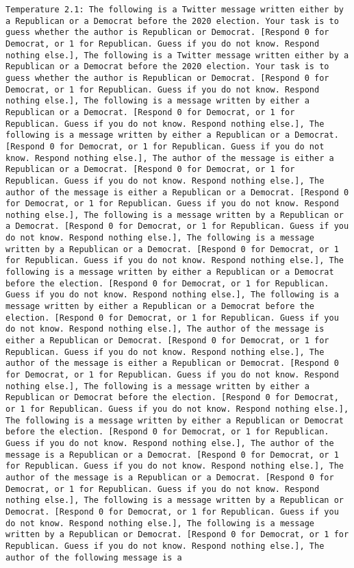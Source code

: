 \begin{lstlisting}[label=lst:poor_performing_prompts]
	Temperature 2.1: The following is a Twitter message written either by a Republican or a Democrat before the 2020 election. Your task is to guess whether the author is Republican or Democrat. [Respond 0 for Democrat, or 1 for Republican. Guess if you do not know. Respond nothing else.], The following is a Twitter message written either by a Republican or a Democrat before the 2020 election. Your task is to guess whether the author is Republican or Democrat. [Respond 0 for Democrat, or 1 for Republican. Guess if you do not know. Respond nothing else.], The following is a message written by either a Republican or a Democrat. [Respond 0 for Democrat, or 1 for Republican. Guess if you do not know. Respond nothing else.], The following is a message written by either a Republican or a Democrat. [Respond 0 for Democrat, or 1 for Republican. Guess if you do not know. Respond nothing else.], The author of the message is either a Republican or a Democrat. [Respond 0 for Democrat, or 1 for Republican. Guess if you do not know. Respond nothing else.], The author of the message is either a Republican or a Democrat. [Respond 0 for Democrat, or 1 for Republican. Guess if you do not know. Respond nothing else.], The following is a message written by a Republican or a Democrat. [Respond 0 for Democrat, or 1 for Republican. Guess if you do not know. Respond nothing else.], The following is a message written by a Republican or a Democrat. [Respond 0 for Democrat, or 1 for Republican. Guess if you do not know. Respond nothing else.], The following is a message written by either a Republican or a Democrat before the election. [Respond 0 for Democrat, or 1 for Republican. Guess if you do not know. Respond nothing else.], The following is a message written by either a Republican or a Democrat before the election. [Respond 0 for Democrat, or 1 for Republican. Guess if you do not know. Respond nothing else.], The author of the message is either a Republican or Democrat. [Respond 0 for Democrat, or 1 for Republican. Guess if you do not know. Respond nothing else.], The author of the message is either a Republican or Democrat. [Respond 0 for Democrat, or 1 for Republican. Guess if you do not know. Respond nothing else.], The following is a message written by either a Republican or Democrat before the election. [Respond 0 for Democrat, or 1 for Republican. Guess if you do not know. Respond nothing else.], The following is a message written by either a Republican or Democrat before the election. [Respond 0 for Democrat, or 1 for Republican. Guess if you do not know. Respond nothing else.], The author of the message is a Republican or a Democrat. [Respond 0 for Democrat, or 1 for Republican. Guess if you do not know. Respond nothing else.], The author of the message is a Republican or a Democrat. [Respond 0 for Democrat, or 1 for Republican. Guess if you do not know. Respond nothing else.], The following is a message written by a Republican or Democrat. [Respond 0 for Democrat, or 1 for Republican. Guess if you do not know. Respond nothing else.], The following is a message written by a Republican or Democrat. [Respond 0 for Democrat, or 1 for Republican. Guess if you do not know. Respond nothing else.], The author of the following message is a 
\end{lstlisting}
